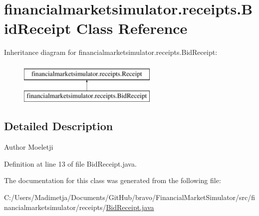 \hypertarget{classfinancialmarketsimulator_1_1receipts_1_1_bid_receipt}{\section{financialmarketsimulator.\+receipts.\+Bid\+Receipt Class Reference}
\label{classfinancialmarketsimulator_1_1receipts_1_1_bid_receipt}
}
Inheritance diagram for financialmarketsimulator.\+receipts.\+Bid\+Receipt\+:\begin{figure}[H]
\begin{center}
\leavevmode
\includegraphics[height=2.000000cm]{classfinancialmarketsimulator_1_1receipts_1_1_bid_receipt}
\end{center}
\end{figure}


\subsection{Detailed Description}
\begin{DoxyAuthor}{Author}
Moeletji 
\end{DoxyAuthor}


Definition at line 13 of file Bid\+Receipt.\+java.



The documentation for this class was generated from the following file\+:\begin{DoxyCompactItemize}
\item 
C\+:/\+Users/\+Madimetja/\+Documents/\+Git\+Hub/bravo/\+Financial\+Market\+Simulator/src/financialmarketsimulator/receipts/\hyperlink{_bid_receipt_8java}{Bid\+Receipt.\+java}\end{DoxyCompactItemize}
